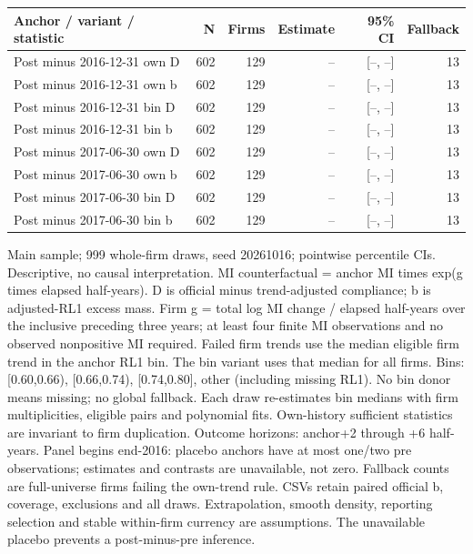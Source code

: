 \endgroup
\par\medskip
\begingroup\scriptsize\setlength{\tabcolsep}{3pt}
\begin{threeparttable}
\begin{tabular}{lrrrrr}
\toprule
Anchor / variant / statistic & N & Firms & Estimate & 95\% CI & Fallback \\
\midrule
Post minus 2016-12-31 own D & 602 & 129 & -- & [--, --] & 13 \\
Post minus 2016-12-31 own b & 602 & 129 & -- & [--, --] & 13 \\
Post minus 2016-12-31 bin D & 602 & 129 & -- & [--, --] & 13 \\
Post minus 2016-12-31 bin b & 602 & 129 & -- & [--, --] & 13 \\
Post minus 2017-06-30 own D & 602 & 129 & -- & [--, --] & 13 \\
Post minus 2017-06-30 own b & 602 & 129 & -- & [--, --] & 13 \\
Post minus 2017-06-30 bin D & 602 & 129 & -- & [--, --] & 13 \\
Post minus 2017-06-30 bin b & 602 & 129 & -- & [--, --] & 13 \\
\bottomrule
\end{tabular}
\begin{tablenotes}[flushleft]\footnotesize
\item[] Main sample; 999 whole-firm draws, seed 20261016; pointwise percentile CIs. Descriptive, no causal interpretation. MI counterfactual = anchor MI times exp(g times elapsed half-years). D is official minus trend-adjusted compliance; b is adjusted-RL1 excess mass. Firm g = total log MI change / elapsed half-years over the inclusive preceding three years; at least four finite MI observations and no observed nonpositive MI required. Failed firm trends use the median eligible firm trend in the anchor RL1 bin. The bin variant uses that median for all firms. Bins: [0.60,0.66), [0.66,0.74), [0.74,0.80], other (including missing RL1). No bin donor means missing; no global fallback. Each draw re-estimates bin medians with firm multiplicities, eligible pairs and polynomial fits. Own-history sufficient statistics are invariant to firm duplication. Outcome horizons: anchor+2 through +6 half-years. Panel begins end-2016: placebo anchors have at most one/two pre observations; estimates and contrasts are unavailable, not zero. Fallback counts are full-universe firms failing the own-trend rule. CSVs retain paired official b, coverage, exclusions and all draws. Extrapolation, smooth density, reporting selection and stable within-firm currency are assumptions. The unavailable placebo prevents a post-minus-pre inference.
\end{tablenotes}
\end{threeparttable}
\endgroup
\par\medskip
